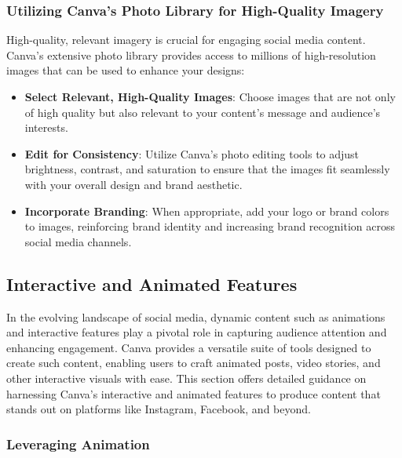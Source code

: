 \documentclass[
]{book}
\providecommand{\tightlist}{%
  \setlength{\itemsep}{0pt}\setlength{\parskip}{0pt}}
\begin{document}
\hypertarget{utilizing-canvas-photo-library-for-high-quality-imagery}{%
\subsubsection*{Utilizing Canva's Photo Library for High-Quality Imagery}\label{utilizing-canvas-photo-library-for-high-quality-imagery}}

High-quality, relevant imagery is crucial for engaging social media content. Canva's extensive photo library provides access to millions of high-resolution images that can be used to enhance your designs:

\begin{itemize}
\tightlist
\item
  \textbf{Select Relevant, High-Quality Images}: Choose images that are not only of high quality but also relevant to your content's message and audience's interests.
\item
  \textbf{Edit for Consistency}: Utilize Canva's photo editing tools to adjust brightness, contrast, and saturation to ensure that the images fit seamlessly with your overall design and brand aesthetic.
\item
  \textbf{Incorporate Branding}: When appropriate, add your logo or brand colors to images, reinforcing brand identity and increasing brand recognition across social media channels.
\end{itemize}

\hypertarget{interactive-and-animated-features}{%
\subsection*{Interactive and Animated Features}\label{interactive-and-animated-features}}

In the evolving landscape of social media, dynamic content such as animations and interactive features play a pivotal role in capturing audience attention and enhancing engagement. Canva provides a versatile suite of tools designed to create such content, enabling users to craft animated posts, video stories, and other interactive visuals with ease. This section offers detailed guidance on harnessing Canva's interactive and animated features to produce content that stands out on platforms like Instagram, Facebook, and beyond.

\hypertarget{leveraging-animation}{%
\subsubsection*{Leveraging Animation}\label{leveraging-animation}}
\end{document}
